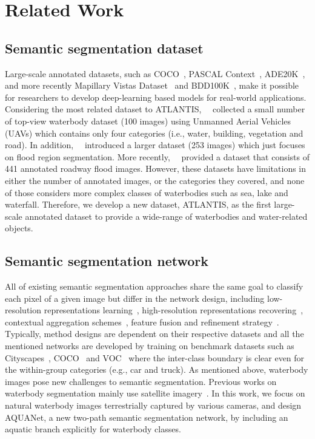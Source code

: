 \documentclass{article}
\begin{document}
\section{Related Work}

\subsection{Semantic segmentation dataset}
Large-scale annotated datasets, such as COCO~\cite{lin2014microsoft}, PASCAL Context~\cite{mottaghi2014role}, ADE20K~\cite{zhou2019semantic}, and more recently Mapillary Vistas Dataset~\cite{neuhold2017mapillary} and BDD100K~\cite{yu2020bdd100k}, make it possible for researchers to develop deep-learning based models for real-world applications. Considering the most related dataset to ATLANTIS,~\citeauthor{gebrehiwot2019deep}~\cite{gebrehiwot2019deep} collected a small number of top-view waterbody dataset (100 images) using Unmanned Aerial Vehicles (UAVs) which contains only four categories (i.e., water, building, vegetation and road). In addition,~\citeauthor{sazara2019detecting}~\cite{sazara2019detecting} introduced a larger dataset (253 images) which just focuses on flood region segmentation. More recently,~\citeauthor{sarp2020detecting}~\cite{sarp2020detecting} provided a dataset that consists of 441 annotated roadway flood images. However, these datasets have limitations in either the number of annotated images, or the categories they covered, and none of those considers more complex classes of waterbodies such as sea, lake and waterfall. Therefore, we develop a new dataset, ATLANTIS, as the first large-scale annotated dataset to provide a wide-range of waterbodies and water-related objects.

\subsection{Semantic segmentation network}
All of existing semantic segmentation approaches share the same goal to classify each pixel of a given image but differ in the network design, including low-resolution representations learning~\cite{long2015fully,chen2017deeplab}, high-resolution representations recovering~\cite{badrinarayanan2015segnet,noh2015learning,lin2017refinenet}, contextual aggregation schemes~\cite{YuanW18,zhao2017pyramid,yuan2019object}, feature fusion and refinement strategy~\cite{lin2017refinenet,huang2019ccnet,li2019expectation,zhu2019asymmetric,fu2019dual}. 
Typically, method designs are dependent on their respective datasets and all the mentioned networks are developed by training on benchmark datasets such as Cityscapes~\cite{cordts2016Cityscapes}, COCO~\cite{lin2014microsoft} and VOC~\cite{everingham2010pascal} where the inter-class boundary is clear even for the within-group categories (e.g., car and truck). As mentioned above, waterbody images pose new challenges to semantic segmentation. Previous works on waterbody segmentation mainly use satellite imagery~\cite{munoz2021local, li2019multiscale, duan2019multiscale}. In this work, we focus on natural waterbody images terrestrially captured by various cameras, and design AQUANet, a new two-path semantic segmentation network, by including an aquatic branch explicitly for waterbody classes.
\end{document}
